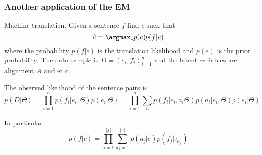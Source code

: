 \documentclass[a4paper]{article}
\begin{document}

\subsubsection{Another application of the EM} %
\label{ssub:another_application_of_the_em}

Machine translation. Given a sentence $f$ find $e$ such that
\[ \hat{e} = \argmax_e p(e) p(f|e)\]
where the probability $p(f|e)$ is the translation likelihood and $p(e)$ is the 
prior probability. The data sample is $D = (e_i,f_i)_{i=1}^n$ and the latent variables
are alignment $A$ and et c.

The observed likelihood of the sentence pairs is
\[
p(D|\Theta)
= \prod_{i=1}^n p(f_i|e_i,\Theta) p(e_i|\Theta)
= \prod_{i=1}^n \sum_{a_i} p(f_i|e_i,a_i\Theta) p(a_i|e_i,\Theta) p(e_i|\Theta)
\]

In particular
\[
p(f|e) = \prod_{j=1}^{|f|} \sum_{a_j=1}^{|e|} p(a_j|e) p(f_j|e_{a_j})
\]

\end{document}
